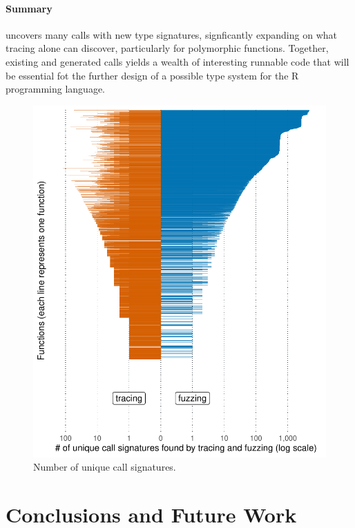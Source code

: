 \documentclass[sigplan,screen]{acmart}
\begin{document}
\paragraph{Summary}

\tool uncovers many calls with new type signatures, signficantly expanding on what tracing alone can discover, particularly for polymorphic functions.
Together, existing and generated calls yields a wealth of interesting runnable code that will be essential fot the further design of a possible type system for the R programming language.


\begin{figure}
    \centering
    \includegraphics[width=\columnwidth]{code-and-figures/uf-call-signatures.pdf}
    \caption{Number of unique call signatures.}
    \label{fig:call-signatures}
\end{figure}

\section{Conclusions and Future Work}
\label{sec:conclusions}
\end{document}
